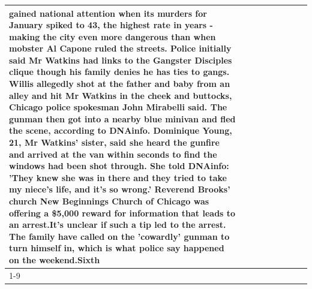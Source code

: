 \begin{table}[H]
\begin{tabular}{lllrlllll}
gained national attention when its murders for January spiked to 43, the highest rate in years - making the city even more dangerous than when mobster Al Capone ruled the streets. Police initially said Mr Watkins had links to the Gangster Disciples clique though his family denies he has ties to gangs. Willis allegedly shot at the father and baby from an alley and hit Mr Watkins in the cheek and buttocks, Chicago police spokesman John Mirabelli said. The gunman then got into a nearby blue minivan and fled the scene, according to DNAinfo. Dominique Young, 21, Mr Watkins' sister, said she heard the gunfire and arrived at the van within seconds to find the windows had been shot through. She told DNAinfo: 'They knew she was in there and they tried to take my niece's life, and it's so wrong.' Reverend Brooks' church New Beginnings Church of Chicago was offering a \$5,000 reward for information that leads to an arrest.It's unclear if such a tip led to the arrest. The family have called on the 'cowardly' gunman to turn himself in, which is what police say happened on the weekend.Sixth \\
\cline{1-9}

\end{tabular}
\end{table}
